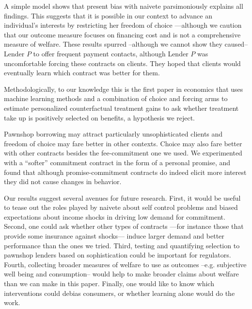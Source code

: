 \documentclass[oneside,11pt]{article}
\begin{document}
A simple model shows that present bias with naivete parsimoniously explains all findings. This suggests that it is possible in our context to advance an individual's interests by restricting her freedom of choice ---although we caution that our outcome measure focuses on financing cost and is not a comprehensive measure of welfare. These results spurred --although we cannot show they caused-- Lender $P$ to offer frequent payment contacts, although Lender $P$ was uncomfortable forcing these contracts on clients. They hoped that clients would eventually learn which contract was better for them.

Methodologically, to our knowledge this is the first paper in economics that uses machine learning methods and a combination of choice and forcing arms to estimate personalized counterfactual treatment gains to ask whether treatment take up is positively selected on benefits, a hypothesis we reject.

Pawnshop borrowing may attract particularly unsophisticated clients and freedom of choice may fare better in other contexts. Choice may also fare better with other contracts besides the fee-commitment one we used. We experimented with a ``softer'' commitment contract in the form of a personal promise, and found that although promise-commitment contracts do indeed elicit more interest they did not cause changes in behavior. 

Our results suggest several avenues for future research. First, it would be useful to tease out the roles played by naivete about self control problems and biased expectations about income shocks in driving low demand for commitment. Second, one could ask whether other types of contracts ---for instance those that provide some insurance against shocks---  induce larger demand and better performance than the ones we tried. Third, testing and quantifying selection to pawnshop lenders based on sophistication could be important for regulators. Fourth, collecting broader measures of welfare to use as outcomes --e.g. subjective well being and consumption-- would help to make broader claims about welfare than we can make in this paper. Finally, one would like to know which interventions could debias consumers, or whether learning alone would do the work.







\newpage
\end{document}
